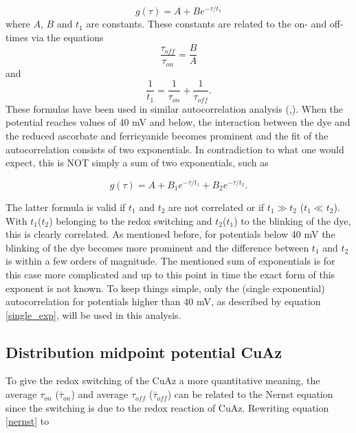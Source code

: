 \documentclass[twoside,single]{lion-msc}
\begin{document}
\begin{equation} \label{single_exp}
g(\tau) =  A + Be^{-\tau/t_{1}}
\end{equation}
where $A$, $B$ and $t_{1}$ are constants. These constants are related to the on- and off-times via the equations
\begin{equation}\label{tau_on}
\frac{\tau_{off}}{\tau_{on}} = \frac{B}{A}
\end{equation}
and
\begin{equation}\label{tau_off}
\frac{1}{t_{1}} = \frac{1}{\tau_{on}} + \frac{1}{\tau_{off}}.
\end{equation}
These formulas have been used in similar autocorrelation analysis (\cite{Wai-TakYip1998},\cite{Vosch2007}). When the potential reaches values of 40 mV and below, the interaction between the dye and the reduced ascorbate and ferricyanide becomes prominent and the fit of the autocorrelation consists of two exponentials. In contradiction to what one would expect, this is NOT simply a sum of two exponentials, such as

\begin{equation}\label{multi_exp}
g(\tau) = A +  B_{1}e^{-\tau/t_{1}} + B_{2}e^{-\tau/t_{2}}. 
\end{equation}

The latter formula is valid if $t_{1}$ and $t_{2}$ are not correlated or if $t_{1} \gg t_{2}$ ($t_{1} \ll  t_{2}$). With $t_{1}$($t_{2}$) belonging to the redox switching and $t_{2}$($t_{1}$) to the blinking of the dye, this is clearly correlated. As mentioned before, for potentials below 40 mV the blinking of the dye becomes more prominent and the difference between $t_{1}$ and $t_{2}$ is within a few orders of magnitude. The mentioned sum of exponentials is for this case more complicated and up to this point in time the exact form of this exponent is not known. To keep things simple, only the (single exponential) autocorrelation for potentials higher than 40 mV, as described by equation \ref{single_exp}, will be used in this analysis.  




\subsection{Distribution midpoint potential CuAz}
To give the redox switching of the CuAz a more quantitative meaning, the average $\tau_{on}$ ($\bar{\tau}_{on}$) and average $\tau_{off}$ ($\bar{\tau}_{off}$) can be related to the Nernst equation since the switching is due to the redox reaction of CuAz. Rewriting equation \ref{nernst} to 
\end{document}
